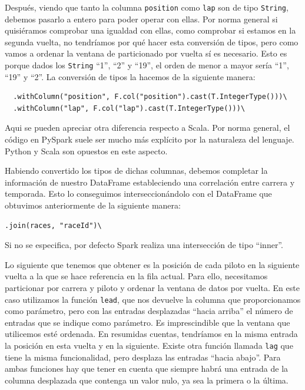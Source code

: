 \documentclass[12pt,twoside,titlepage]{report}
\newcommand{\quotes}[1]{``#1''}
\begin{document}
Después, viendo que tanto la columna \texttt{position} como \texttt{lap} son de tipo \texttt{String}, debemos pasarlo a entero para poder operar con ellas. Por norma general si quisiéramos comprobar una igualdad con ellas, como comprobar si estamos en la segunda vuelta, no tendríamos por qué hacer esta conversión de tipos, pero como vamos a ordenar la ventana de particionado por vuelta sí es necesario. Esto es porque dados los \texttt{String} \quotes{1}, \quotes{2} y \quotes{19}, el orden de menor a mayor sería \quotes{1}, \quotes{19} y \quotes{2}. La conversión de tipos la hacemos de la siguiente manera:

\begin{lstlisting}
  .withColumn("position", F.col("position").cast(T.IntegerType()))\
  .withColumn("lap", F.col("lap").cast(T.IntegerType()))\
\end{lstlisting}

Aqui se pueden apreciar otra diferencia respecto a Scala. Por norma general, el código en PySpark suele ser mucho más explícito por la naturaleza del lenguaje. Python y Scala son opuestos en este aspecto. 

Habiendo convertido los tipos de dichas columnas, debemos completar la información de nuestro DataFrame estableciendo una correlación entre carrera y temporada. Esto lo conseguimos interseccionándolo con el DataFrame que obtuvimos anteriormente de la siguiente manera:

\begin{lstlisting}
.join(races, "raceId")\  
\end{lstlisting}

Si no se especifica, por defecto Spark realiza una intersección de tipo \quotes{inner}.

Lo siguiente que tenemos que obtener es la posición de cada piloto en la siguiente vuelta a la que se hace referencia en la fila actual. Para ello, necesitamos particionar por carrera y piloto y ordenar la ventana de datos por vuelta. En este caso utilizamos la función \texttt{lead}, que nos devuelve la columna que proporcionamos como parámetro, pero con las entradas desplazadas \quotes{hacia arriba} el número de entradas que se indique como parámetro. Es imprescindible que la ventana que utilicemos esté ordenada. En resumidas cuentas, tendríamos en la misma entrada la posición en esta vuelta y en la siguiente. Existe otra función llamada \texttt{lag} que tiene la misma funcionalidad, pero desplaza las entradas \quotes{hacia abajo}. Para ambas funciones hay que tener en cuenta que siempre habrá una entrada de la columna desplazada que contenga un valor nulo, ya sea la primera o la última.
\end{document}
